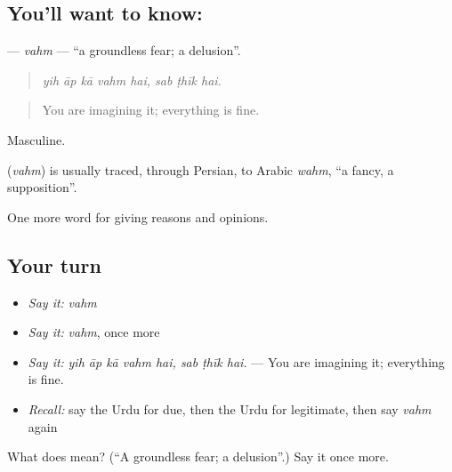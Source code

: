 \subsection*{You'll want to know: }
\textbf{} — \emph{vahm} — \textquotedblleft{}a groundless fear; a delusion\textquotedblright{}.

\begin{quote}
       
\end{quote}

\begin{quote}
\emph{yih āp kā vahm hai, sab ṭhīk hai.}
\end{quote}

\begin{quote}
You are imagining it; everything is fine.
\end{quote}

Masculine.

\begin{cousinweb}
\textbf{} (\emph{vahm}) is usually traced, through Persian, to Arabic \emph{wahm}, \textquotedblleft{}a fancy, a supposition\textquotedblright{}.
\end{cousinweb}

\begin{grammarlens}[title={What you've built}]
One more word for giving reasons and opinions.
\end{grammarlens}

\subsection*{Your turn}
\begin{itemize}
\raggedright
  \item \emph{Say it:} \emph{vahm}
  \item \emph{Say it:} \emph{vahm}, once more
  \item \emph{Say it:} \emph{yih āp kā vahm hai, sab ṭhīk hai.} — You are imagining it; everything is fine.
  \item \emph{Recall:} say the Urdu for due, then the Urdu for legitimate, then say \emph{vahm} again
\end{itemize}

\begin{tcolorbox}[breakable,colback=teal!4,colframe=teal!35!black,title={Before you move on}]
What does  mean? (\textquotedblleft{}A groundless fear; a delusion\textquotedblright{}.) Say it once more.
\end{tcolorbox}
